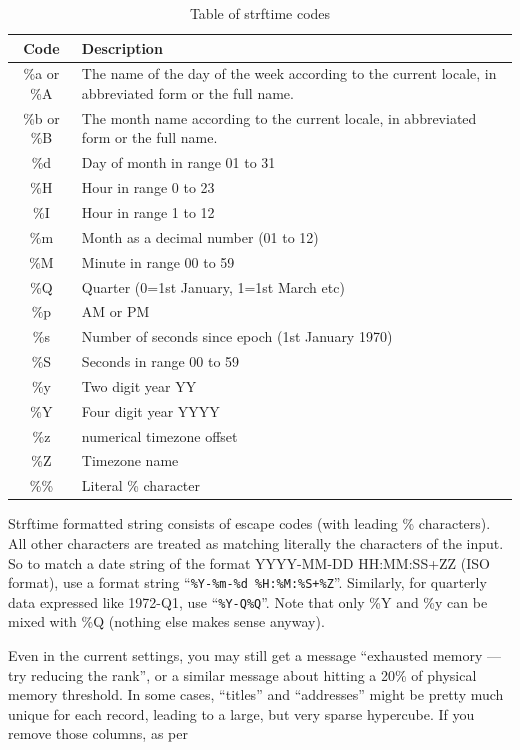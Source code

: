 \begin{table}
  \begin{tabular}{|c|l|}
    \hline Code & Description \\\hline
    \%a or \%A &  The name of the day of the week according to the current locale,
                 in abbreviated form or the full name.\\
    \%b or \%B &  The month name according to the current locale,  in  abbreviated
              form or the full name.\\
    \%d & Day of month in range 01 to 31\\
    \%H & Hour in range 0 to 23\\
    \%I & Hour in range 1 to 12\\
    \%m & Month as a decimal number (01 to 12)\\
    \%M & Minute in range 00 to 59\\
    \%Q & Quarter (0=1st January, 1=1st March etc)\\
    \%p & AM or PM\\
    \%s & Number of seconds since epoch (1st January 1970)\\
    \%S & Seconds in range 00 to 59 \\
    \%y & Two digit year YY\\
    \%Y & Four digit year YYYY\\
    \%z & numerical timezone offset\\
    \%Z & Timezone name\\
    \%\% & Literal \% character\\
    \hline
  \end{tabular}
  \caption{Table of strftime codes}
  \label{Strftime code}
\end{table}

Strftime formatted string consists of escape codes (with leading \%
characters). All other characters are treated as matching literally
the characters of the input. So to match a date string of the format
YYYY-MM-DD HH:MM:SS+ZZ (ISO format), use a format string
``\verb|%Y-%m-%d %H:%M:%S+%Z|''. Similarly, for quarterly data
expressed like 1972-Q1, use ``\verb+%Y-Q%Q+''. Note that only \%Y and
\%y can be mixed with \%Q (nothing else makes sense anyway).

Even in the current settings, you may still get a message ``exhausted
memory --- try reducing the rank'', or a similar message about hitting
a 20\% of physical memory threshold. In some cases, ``titles''
and ``addresses'' might be pretty much unique for each record, leading to a
large, but very sparse hypercube. If you remove those columns, as per

